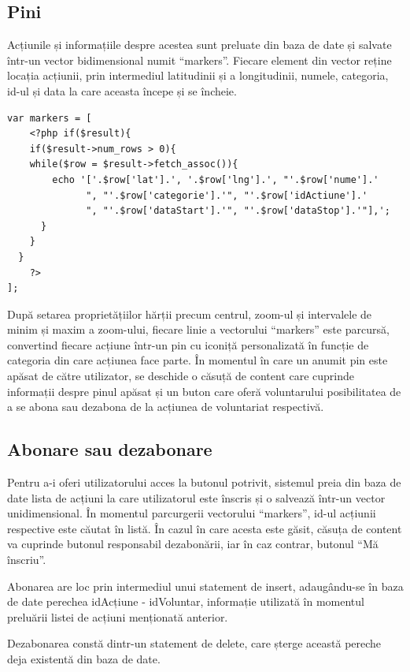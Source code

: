 \documentclass[12pt,a4paper]{report}
\begin{document}
\subsection{Pini}
\par
Acțiunile și informațiile despre acestea sunt preluate din baza de date și salvate într-un vector bidimensional numit “markers”. Fiecare element din vector reține locația acțiunii, prin intermediul latitudinii și a longitudinii, numele, categoria, id-ul și data la care aceasta începe și se încheie.

\begin{lstlisting}
var markers = [
    <?php if($result){
    if($result->num_rows > 0){
    while($row = $result->fetch_assoc()){
        echo '['.$row['lat'].', '.$row['lng'].', "'.$row['nume'].'
              ", "'.$row['categorie'].'", "'.$row['idActiune'].'
              ", "'.$row['dataStart'].'", "'.$row['dataStop'].'"],';
      }
    }
  }
    ?>
];
\end{lstlisting}

\par
După setarea proprietățiilor hărții precum centrul, zoom-ul și intervalele de minim și maxim a zoom-ului, fiecare linie a vectorului “markers” este parcursă, convertind fiecare acțiune într-un pin cu iconiță personalizată în funcție de categoria din care acțiunea face parte. În momentul în care un anumit pin este apăsat de către utilizator, se deschide o căsuță de content care cuprinde informații despre pinul apăsat și un buton care oferă voluntarului posibilitatea de a se abona sau dezabona de la acțiunea de voluntariat respectivă.

\newpage
\subsection{Abonare sau dezabonare}
\par
Pentru a-i oferi utilizatorului acces la butonul potrivit, sistemul preia din baza de date lista de acțiuni la care utilizatorul este înscris și o salvează într-un vector unidimensional. În momentul parcurgerii vectorului “markers”, id-ul acțiunii respective este căutat în listă. În cazul în care acesta este găsit, căsuța de content va cuprinde butonul responsabil dezabonării, iar în caz contrar, butonul  “Mă înscriu”.
\\
\par
Abonarea are loc prin intermediul unui statement de insert, adaugându-se în baza de date perechea idAcțiune - idVoluntar, informație utilizată în momentul preluării listei de acțiuni menționată anterior.
\\
\par
Dezabonarea constă dintr-un statement de delete, care șterge această pereche deja existentă din baza de date.
\end{document}
